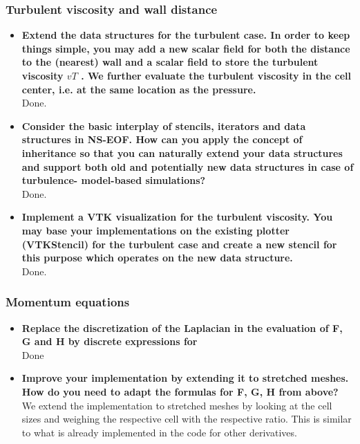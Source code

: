 \documentclass[a4paper]{article}
\begin{document}
\subsubsection{Turbulent viscosity and wall distance}
\begin{itemize}
	\item \textbf{Extend the data structures for the turbulent case. In order to keep things simple, you may add a new scalar field for both the distance to the (nearest) wall and a scalar field to store the turbulent viscosity $vT$ . We further evaluate the turbulent viscosity in the cell center, i.e. at the same location as the pressure.}\\
	Done.
	\item \textbf{Consider the basic interplay of stencils, iterators and data structures in NS-EOF. How can you apply the concept of inheritance so that you can naturally extend your data structures and support both old and potentially new data structures in case of turbulence- model-based simulations?}\\
	Done.
	\item \textbf{Implement a VTK visualization for the turbulent viscosity. You may base your implementations on the existing plotter (VTKStencil) for the turbulent case and create a new stencil for this purpose which operates on the new data structure.}\\
	Done.
\end{itemize}

\subsubsection{Momentum equations}
\begin{itemize}
	\item \textbf{Replace the discretization of the Laplacian in the evaluation of F, G and H by discrete expressions for}\\
	Done\\
	\item \textbf{Improve your implementation by extending it to stretched meshes. How do you need to adapt the formulas for F, G, H from above?}\\
	We extend the implementation to stretched meshes by looking at the cell sizes and weighing the respective cell with the respective ratio. This is similar to what is already implemented in the code for other derivatives.
\end{itemize}
\end{document}
